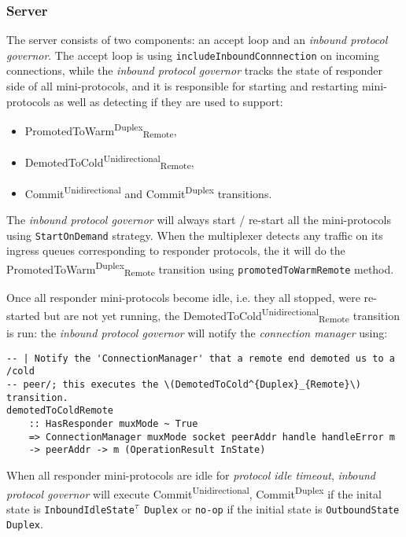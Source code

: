 \documentclass{article}
\def\OutboundStateDup{\texttt{OutboundState\phantom{\textsuperscript{$\tau$}} Duplex}}
\def\InboundIdleStateDup{\texttt{InboundIdleState\textsuperscript{$\tau$} Duplex}}
\def\PromotedToWarmDupRem{\textsf{PromotedToWarm}\textsuperscript{\textsf{Duplex}}\textsubscript{\textsf{Remote}}}
\def\DemotedToColdUniRem{\textsf{DemotedToCold}\textsuperscript{\textsf{Unidirectional}}\textsubscript{\textsf{Remote}}}
\def\CommitDup{\textsf{Commit}\textsuperscript{\textsf{Duplex}}}
\def\CommitUni{\textsf{Commit}\textsuperscript{\textsf{Unidirectional}}}
\def\inbgov{\textit{inbound protocol governor}}
\def\connmngr{\textit{connection manager}}
\begin{document}
\subsubsection{Server}

The server consists of two components: an accept loop and an \inbgov{}.  The
accept loop is using \texttt{includeInboundConnnection} on incoming
connections, while the \inbgov{} tracks the state of responder side of all
mini-protocols, and it is responsible for starting and restarting
mini-protocols as well as detecting if they are used to support:
\begin{itemize}
  \item \PromotedToWarmDupRem{},
  \item \DemotedToColdUniRem{},
  \item \CommitUni{} and \CommitDup{} transitions.
\end{itemize}

The \inbgov{} will always start / re-start all the mini-protocols using
\texttt{StartOnDemand} strategy.  When the multiplexer detects
any traffic on its ingress queues corresponding to responder protocols, the
it will do the \PromotedToWarmDupRem{} transition using
\texttt{promotedToWarmRemote} method.

Once all responder mini-protocols become idle, i.e. they all stopped, were
re-started but are not yet running, the \DemotedToColdUniRem{} transition is
run: the \inbgov{} will notify the \connmngr{} using:

\begin{lstlisting}
-- | Notify the 'ConnectionManager' that a remote end demoted us to a /cold
-- peer/; this executes the \(DemotedToCold^{Duplex}_{Remote}\) transition.
demotedToColdRemote
    :: HasResponder muxMode ~ True
    => ConnectionManager muxMode socket peerAddr handle handleError m
    -> peerAddr -> m (OperationResult InState)
\end{lstlisting}

When all responder mini-protocols are idle for \textit{protocol idle timeout},
\inbgov{} will execute \CommitUni{}, \CommitDup{} if the inital state is
\InboundIdleStateDup{} or \texttt{no-op} if the initial state is
\OutboundStateDup{}.
\end{document}
